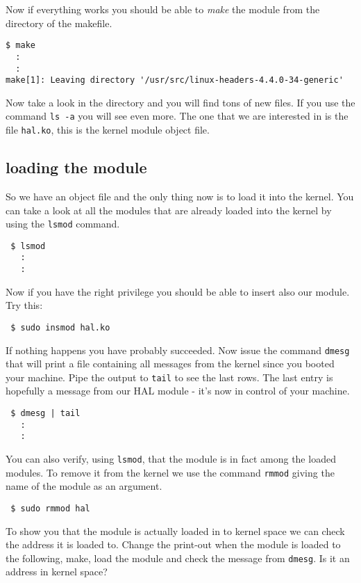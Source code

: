 \documentclass[a4paper,11pt]{article}
\begin{document}
Now if everything works you should be able to {\em make} the module
from the directory of the makefile.

\begin{verbatim}
$ make
  :
  :
make[1]: Leaving directory '/usr/src/linux-headers-4.4.0-34-generic'
\end{verbatim}

Now take a look in the directory and you will find tons of new
files. If you use the command {\tt ls -a} you will see even more. The
one that we are interested in is the file {\tt hal.ko}, this is the
kernel module object file. 

\subsection{loading the module}

So we have an object file and the only thing now is to load it into
the kernel. You can take a look at all the modules that are already
loaded into the kernel by using the {\tt lsmod} command.

\begin{verbatim}
 $ lsmod
   :
   :
\end{verbatim}

Now if you have the right privilege you should be able to insert also
our module. Try this:

\begin{verbatim}
 $ sudo insmod hal.ko
\end{verbatim}

If nothing happens you have probably succeeded. Now issue the command
{\tt dmesg} that will print a file containing all messages from the
kernel since you booted your machine. Pipe the output to {\tt tail} to
see the last rows. The last entry is hopefully a message from our
HAL module - it's now in control of your machine.

\begin{verbatim}
 $ dmesg | tail
   :
   :
\end{verbatim}

You can also verify, using {\tt lsmod}, that the module is in fact
among the loaded modules. To remove it from the kernel we use the
command {\tt rmmod} giving the name of the module as an argument. 

\begin{verbatim}
 $ sudo rmmod hal
\end{verbatim}

To show you that the module is actually loaded in to kernel space we
can check the address it is loaded to. Change the print-out when the
module is loaded to the following, make, load the module and check the
message from {\tt dmesg}. Is it an address in kernel space?
\end{document}
